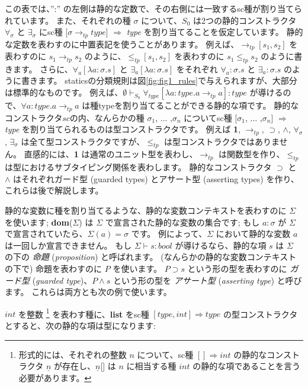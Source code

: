 \documentclass[submit,techreq,noauthor,onecolumn]{ipsj}
\begin{document}
\noindent この表では、'':'' の左側は静的な定数で、その右側には一致するsc種が割り当てられています。
また、それぞれの種 $\sigma$ について、$S_0$ は2つの静的コンストラクタ $\forall_\sigma$ と $\exists_\sigma$ にsc種 [$\sigma \rightarrow_{tp} type$] $\Rightarrow$ {\it type} を割り当てることを仮定しています。
静的な定数を表わすのに中置表記を使うことがあります。
例えば、$\rightarrow_{tp} [s_1,s_2]$ を表わすのに $s_1 \rightarrow_{tp} s_2$ のように、$\leq_{tp} [s_1,s_2]$ を表わすのに $s_1 \leq_{tp} s_2$ のように書きます。
さらに、$\forall_a [\lambda a : \sigma.s]$ と $\exists_a [\lambda a : \sigma.s]$ をそれぞれ $\forall_a : \sigma.s$ と $\exists_a : \sigma.s$ のように書きます。
staticsの分類規則は図\ref{fig:fig1_rules}で与えられますが、大部分は標準的なものです。
例えば、$\emptyset \vdash_{S_0} \forall_{type} [\lambda a : type.a \rightarrow_{tp} a] : type$ が導けるので、$\forall a : type.a \rightarrow_{tp} a$ は種typeを割り当てることができる静的な項です。
静的なコンストラクタ$sc$の内、なんらかの種 $\sigma_1$, $\ldots$ ,$\sigma_n$ についてsc種 [$\sigma_1$, $\ldots$ ,$\sigma_n$] $\Rightarrow$ {\it type} を割り当てられるものは型コンストラクタです。
例えば {\bf 1}, $\rightarrow_{tp}$, $\supset$, $\wedge$, $\forall_\sigma$, $\exists_\sigma$ は全て型コンストラクタですが、$\leq_{tp}$ は型コンストラクタではありません。
直感的には、{\bf 1} は通常のユニット型を表わし、$\rightarrow_{tp}$ は関数型を作り、$\leq_{tp}$ は型におけるサブタイピング関係を表わします。
静的なコンストラクタ $\supset$ と $\wedge$ はそれぞれガード型 (guarded types) とアサート型 (asserting types) を作り、これらは後で解説します。

静的な変数に種を割り当てるような、静的な変数コンテキストを表わすのに $\Sigma$ を使います;
{\bf dom}($\Sigma$) は $\Sigma$ で宣言された静的な変数の集合です;
もし $a : \sigma$ が $\Sigma$ で宣言されていたら、$\Sigma (a) = \sigma$ です。
例によって、$\Sigma$ において静的な変数 $a$ は一回しか宣言できません。
もし $\Sigma \vdash s : bool$ が導けるなら、静的な項 $s$ は $\Sigma$ の下の {\it 命題} ({\it proposition}) と呼ばれます。
(なんらかの静的な変数コンテキストの下で) 命題を表わすのに $P$ を使います。
$P \supset s$ という形の型を表わすのに {\it ガード型} ({\it guarded type})、$P \wedge s$ という形の型を {\it アサート型} ({\it asserting type}) と呼びます。
これらは両方とも次の例で使います。

$int$ を整数
\footnote{形式的には、それぞれの整数 $n$ について、sc種 $[] \Rightarrow int$ の静的なコンストラクタ $\underline n$ が存在し、$\underline n$[] は $n$ に相当する種 $int$ の静的な項であることを言う必要があります。
}
を表わす種に、{\bf list} をsc種 $[type,int] \Rightarrow type$ の型コンストラクタとすると、次の静的な項は型になります:
\end{document}
